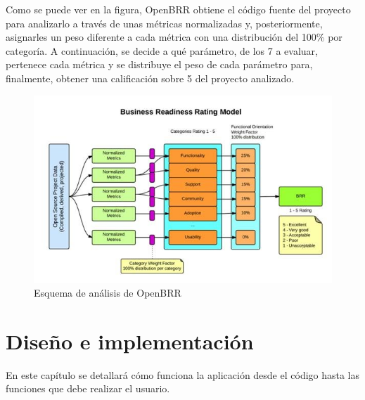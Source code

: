 \documentclass[a4paper, 12pt]{book}
\begin{document}
Como se puede ver en la figura, OpenBRR obtiene el código fuente del proyecto para analizarlo a través de unas métricas normalizadas y, posteriormente, asignarles un peso diferente a cada métrica con una distribución del 100\% por categoría. A continuación, se decide a qué parámetro, de los 7 a evaluar, pertenece cada métrica y se distribuye el peso de cada parámetro para, finalmente, obtener una calificación sobre 5 del proyecto analizado.
\begin{figure}
  \centering
  \includegraphics[width=18cm, keepaspectratio]{img/openbrr.png}
  \caption{Esquema de análisis de OpenBRR}\label{fig:OpenBRR}
\end{figure}
\cleardoublepage
\chapter{Diseño e implementación}
\label{chap:diseño}
En este capítulo se detallará cómo funciona la aplicación desde el código hasta las funciones que debe realizar el usuario.
\end{document}
